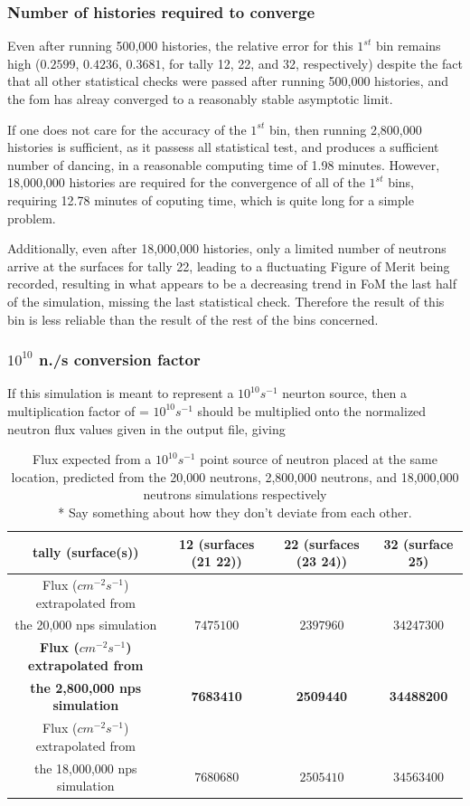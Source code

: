 \documentclass[a4paper, 12pt]{article}
\begin{document}
\subsubsection{Number of histories required to converge}\label{Ex1NumHist}
Even after running 500,000 histories, the relative error for this $1^{st}$ bin remains high ($0.2599$, $0.4236$, $0.3681$, for tally 12, 22, and 32, respectively) despite the fact that all other statistical checks were passed after running 500,000 histories, and the fom has alreay converged to a reasonably stable asymptotic limit.

If one does not care for the accuracy of the $1^{st}$ bin, then running 2,800,000 histories is sufficient, as it passess all statistical test, and produces a sufficient number of dancing, in a reasonable computing time of 1.98 minutes. However, 18,000,000 histories are required for the convergence of all of the $1^{st}$ bins, requiring 12.78 minutes of coputing time, which is quite long for a simple problem.

Additionally, even after 18,000,000 histories, only a limited number of neutrons arrive at the surfaces for tally 22, leading to a fluctuating Figure of Merit being recorded, resulting in what appears to be a decreasing trend in FoM the last half of the simulation, missing the last statistical check. Therefore the result of this bin is less reliable than the result of the rest of the bins concerned.

\subsubsection{$10^{10}$ n./s conversion factor}
	If this simulation is meant to represent a $10^{10} s^{-1}$ neurton source, then a multiplication factor of = $ 10^{10} s^{-1}$ should be multiplied onto the normalized neutron flux values given in the output file, giving
\begin{table}[H]
	\centering
	\begin{tabular}{c|ccc}
		tally (surface(s)) & 12 (surfaces (21 22)) & 22 (surfaces (23 24)) & 32 (surface 25)	\\
		\hline
		Flux (${cm}^{-2}s^{-1}$) extrapolated from \\
		the 20,000 nps simulation     & $7475100 $ & $2397960 $ & $34247300 $ \\
		\hline
		\textbf{Flux (${cm}^{-2}s^{-1}$) extrapolated from } \\*
		\textbf{the 2,800,000 nps simulation} & \textbf{7683410}& \textbf{2509440} & \textbf{34488200} \\
		\hline
		Flux (${cm}^{-2}s^{-1}$) extrapolated from \\
		the 18,000,000 nps simulation & $7680680 $ & $2505410 $ & $34563400 $
	\end{tabular}
	\caption{Flux expected from a $10^{10} s^{-1}$ point source of neutron placed at the same location, predicted from the 20,000 neutrons, 2,800,000 neutrons, and 18,000,000 neutrons simulations respectively
	\\* Say something about how they don't deviate from each other.
	}\label{Ex1FluxCalc}
\end{table}
\end{document}
